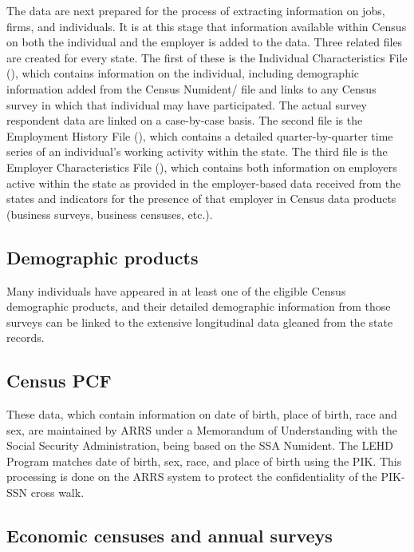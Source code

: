 The data are next prepared for the process of extracting information on
jobs, firms, and individuals. It is at this stage that information
available within Census on both the individual and the employer is added to
the data.  Three related files are created for every state. The first of
these is the Individual Characteristics File (), which contains
information on the individual, including demographic information added from
the Census Numident/ file and links to
any Census survey in which that individual may have participated.  The
actual survey respondent data are linked on a case-by-case basis. The
second file is the Employment History File (), which contains a
detailed quarter-by-quarter time series of an individual's working activity
within the state. The third file is the Employer Characteristics File
(), which contains both information on employers active within
the state as provided in the employer-based data received from the states
and indicators for the presence of that employer in Census data products
(business surveys, business censuses, etc.).

\subsection{Demographic products}

Many
individuals have appeared in at least one of the eligible Census demographic 
products, and their detailed demographic information from those surveys can 
be linked to the extensive longitudinal data gleaned from the state records.


\subsection{Census PCF}

These data, which contain information on date of birth, place of birth,
race and sex, are maintained by ARRS under a Memorandum of
Understanding with the Social Security Administration, being
based on the SSA Numident. The LEHD Program matches date of birth, sex,
race, and place of birth using the PIK. This processing is done
on the ARRS system to protect the confidentiality of the
PIK-SSN cross walk.

\subsection{Economic censuses and annual surveys}

